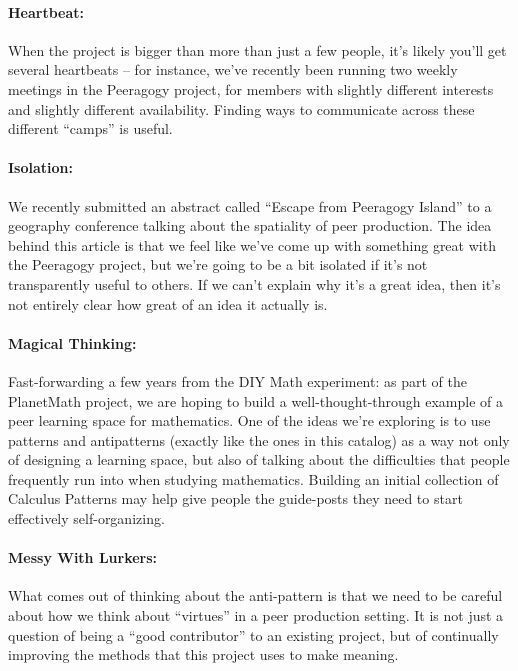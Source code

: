 \paragraph{Heartbeat:} When the project is bigger than more than just a few people, it’s likely
you’ll get several heartbeats – for instance, we’ve recently been
running two weekly meetings in the Peeragogy project, for members with
slightly different interests and slightly different availability.
Finding ways to communicate across these different “camps” is useful.

\paragraph{Isolation:} We recently submitted an abstract called “Escape from Peeragogy Island”
to a geography conference talking about the spatiality of peer
production. The idea behind this article is that we feel like we’ve come
up with something great with the Peeragogy project, but we’re going to
be a bit isolated if it’s not transparently useful to others. If we
can’t explain why it’s a great idea, then it’s not entirely clear how
great of an idea it actually is.

\paragraph{Magical Thinking:}  Fast-forwarding a few years from the DIY Math experiment: as part of the
PlanetMath project, we are hoping to build a well-thought-through
example of a peer learning space for mathematics. One of the ideas we’re
exploring is to use patterns and antipatterns (exactly like the ones in
this catalog) as a way not only of designing a learning space, but also
of talking about the difficulties that people frequently run into when
studying mathematics. Building an initial collection of Calculus
Patterns may help give people the guide-posts they need to start
effectively self-organizing.

\paragraph{Messy With Lurkers:} What comes out of thinking about the anti-pattern is that we need to be
careful about how we think about “virtues” in a peer production setting.
It is not just a question of being a “good contributor” to an existing
project, but of continually improving the methods that this project uses
to make meaning.

